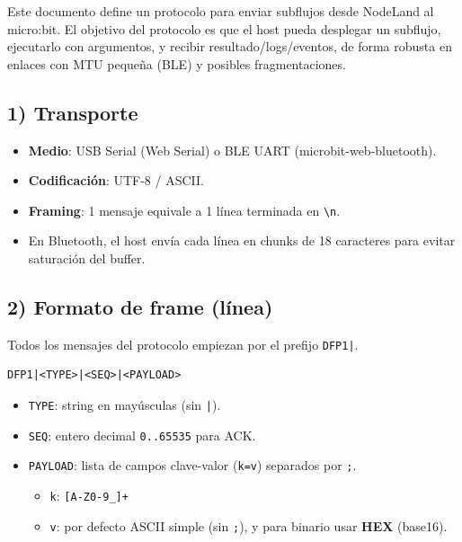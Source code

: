\label{apx:microbit-protocol}

Este documento define un protocolo para enviar subflujos desde NodeLand al micro:bit. El objetivo del protocolo es que el host pueda desplegar un subflujo, ejecutarlo con argumentos, y recibir resultado/logs/eventos, de forma robusta en enlaces con MTU pequeña (BLE) y posibles fragmentaciones.

\subsection*{1) Transporte}

\begin{itemize}
    \item \textbf{Medio}: USB Serial (Web Serial) o BLE UART (microbit-web-bluetooth).
    \item \textbf{Codificación}: UTF-8 / ASCII.
    \item \textbf{Framing}: 1 mensaje equivale a 1 línea terminada en \texttt{\textbackslash{}n}.
    \item En Bluetooth, el host envía cada línea en chunks de 18 caracteres para evitar saturación del buffer.
\end{itemize}

\subsection*{2) Formato de frame (línea)}

Todos los mensajes del protocolo empiezan por el prefijo \texttt{DFP1|}.

\begin{verbatim}
DFP1|<TYPE>|<SEQ>|<PAYLOAD>
\end{verbatim}

\begin{itemize}
    \item \texttt{TYPE}: string en mayúsculas (sin \texttt{|}).
    \item \texttt{SEQ}: entero decimal \texttt{0..65535} para ACK.
    \item \texttt{PAYLOAD}: lista de campos clave-valor (\texttt{k=v}) separados por \texttt{;}.
          \begin{itemize}
              \item \texttt{k}: \texttt{[A-Z0-9\_]+}
              \item \texttt{v}: por defecto ASCII simple (sin \texttt{;}), y para binario usar \textbf{HEX} (base16).
          \end{itemize}
\end{itemize}

